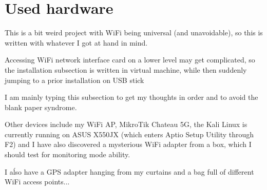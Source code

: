 \documentclass[../wifi-security.tex]{subfiles}
\begin{document}
\section{Used hardware}

This is a bit weird project with WiFi being universal (and unavoidable), so this is written with whatever I got at hand in mind.

Accessing WiFi network interface card on a lower level may get complicated, so the installation subsection is written in virtual machine, while then suddenly jumping to a prior installation on USB stick

I am mainly typing this subsection to get my thoughts in order and to avoid the blank paper syndrome.

Other devices include my WiFi AP, MikroTik Chateau 5G, the Kali Linux is currently running on ASUS X550JX (which enters Aptio Setup Utility through F2) and I have also discovered a mysterious WiFi adapter from a box, which I should test for monitoring mode ability.

I aĺso have a GPS adapter hanging from my curtains and a bag full of different WiFi access points...
\end{document}
